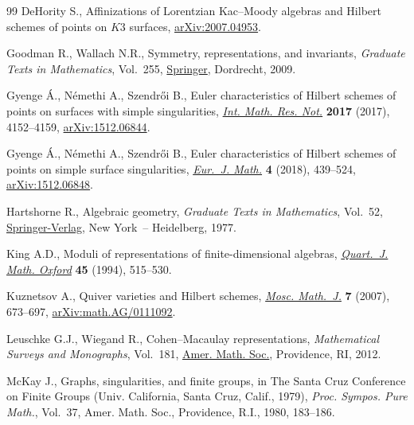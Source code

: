 \documentclass[pdftex]{sigma}%
\numberwithin{equation}{section}
\begin{document}
\begin{thebibliography}{99}
DeHority S., Affinizations of {L}orentzian {K}ac--{M}oody algebras and
 {H}ilbert schemes of points on {$K3$} surfaces, \href{https://arxiv.org/abs/2007.04953}{arXiv:2007.04953}.

Goodman R., Wallach N.R., Symmetry, representations, and invariants,
 \textit{Graduate Texts in Mathematics}, Vol.~255, \href{https://doi.org/10.1007/978-0-387-79852-3}{Springer}, Dordrecht, 2009.

Gyenge \'A., N\'emethi A., Szendr\H{o}i B., Euler characteristics of {H}ilbert
 schemes of points on surfaces with simple singularities, \href{https://doi.org/10.1093/imrn/rnw139}{\textit{Int. Math.
 Res. Not.}} \textbf{2017} (2017), 4152--4159, \href{https://arxiv.org/abs/1512.06844}{arXiv:1512.06844}.

Gyenge \'A., N\'emethi A., Szendr\H{o}i B., Euler characteristics of {H}ilbert
 schemes of points on simple surface singularities, \href{https://doi.org/10.1007/s40879-018-0222-4}{\textit{Eur.~J. Math.}}
 \textbf{4} (2018), 439--524, \href{https://arxiv.org/abs/1512.06848}{arXiv:1512.06848}.

Hartshorne R., Algebraic geometry, \textit{Graduate Texts in Mathematics},
 Vol.~52, \href{https://doi.org/10.1007/978-1-4757-3849-0}{Springer-Verlag}, New York~-- Heidelberg, 1977.

King A.D., Moduli of representations of finite-dimensional algebras,
 \href{https://doi.org/10.1093/qmath/45.4.515}{\textit{Quart.~J. Math. Oxford}} \textbf{45} (1994), 515--530.

Kuznetsov A., Quiver varieties and {H}ilbert schemes, \href{https://doi.org/10.17323/1609-4514-2007-7-4-673-697}{\textit{Mosc. Math.~J.}}
 \textbf{7} (2007), 673--697, \href{https://arxiv.org/abs/math.AG/0111092}{arXiv:math.AG/0111092}.

Leuschke G.J., Wiegand R., Cohen--{M}acaulay representations,
 \textit{Mathematical Surveys and Monographs}, Vol.~181, \href{https://doi.org/10.1090/surv/181}{Amer. Math. Soc.},
 Providence, RI, 2012.

McKay J., Graphs, singularities, and finite groups, in The {S}anta {C}ruz
 {C}onference on {F}inite {G}roups ({U}niv. {C}alifornia, {S}anta {C}ruz,
 {C}alif., 1979), \textit{Proc. Sympos. Pure Math.}, Vol.~37, Amer. Math.
 Soc., Providence, R.I., 1980, 183--186.


\end{thebibliography}
\end{document}
